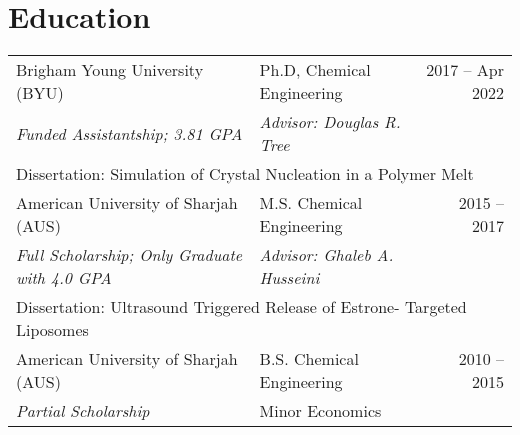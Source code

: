 \documentclass[letterpaper,11pt]{article}
\begin{document}
\section*{Education}
\begin{tabular}{@{}p{} p{} r@{}}
     Brigham Young University (BYU)           & Ph.D, Chemical Engineering & 2017 -- Apr 2022 \\
     \multicolumn{1}{l}{\emph{Funded Assistantship; 3.81 GPA}}    & \emph{Advisor: Douglas R. Tree} & \\
     \multicolumn{3}{l}{Dissertation: Simulation of Crystal Nucleation in a Polymer Melt}\\
     [4pt]

     American University of Sharjah (AUS)     & M.S. Chemical Engineering & 2015 -- 2017 \\
     \multicolumn{1}{l}{\emph{Full Scholarship; Only Graduate with 4.0 GPA}}               & \emph{Advisor: Ghaleb A. Husseini} & \\
     \multicolumn{3}{l}{Dissertation: Ultrasound Triggered Release of Estrone- Targeted Liposomes}\\
      [4pt]

     American University of Sharjah (AUS)     & B.S. Chemical Engineering  & 2010 -- 2015 \\
     \multicolumn{1}{l}{\emph{Partial Scholarship}}                  & Minor Economics
\end{tabular}

\end{document}
